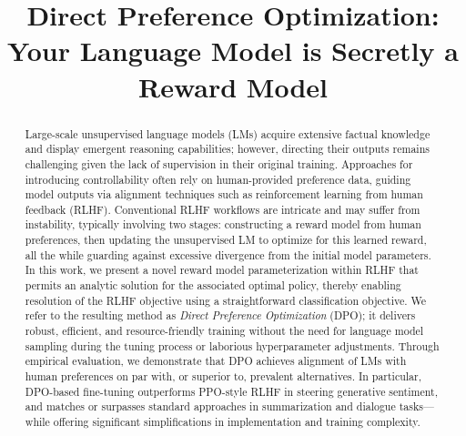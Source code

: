 \title{Direct Preference Optimization: Your Language Model is Secretly a Reward Model}

\begin{abstract}
Large-scale unsupervised language models (LMs) acquire extensive factual knowledge and display emergent reasoning capabilities; however, directing their outputs remains challenging given the lack of supervision in their original training. Approaches for introducing controllability often rely on human-provided preference data, guiding model outputs via alignment techniques such as reinforcement learning from human feedback (RLHF). Conventional RLHF workflows are intricate and may suffer from instability, typically involving two stages: constructing a reward model from human preferences, then updating the unsupervised LM to optimize for this learned reward, all the while guarding against excessive divergence from the initial model parameters. In this work, we present a novel reward model parameterization within RLHF that permits an analytic solution for the associated optimal policy, thereby enabling resolution of the RLHF objective using a straightforward classification objective. We refer to the resulting method as \textit{Direct Preference Optimization} (DPO); it delivers robust, efficient, and resource-friendly training without the need for language model sampling during the tuning process or laborious hyperparameter adjustments. Through empirical evaluation, we demonstrate that DPO achieves alignment of LMs with human preferences on par with, or superior to, prevalent alternatives. In particular, DPO-based fine-tuning outperforms PPO-style RLHF in steering generative sentiment, and matches or surpasses standard approaches in summarization and dialogue tasks—while offering significant simplifications in implementation and training complexity.
\end{abstract}


